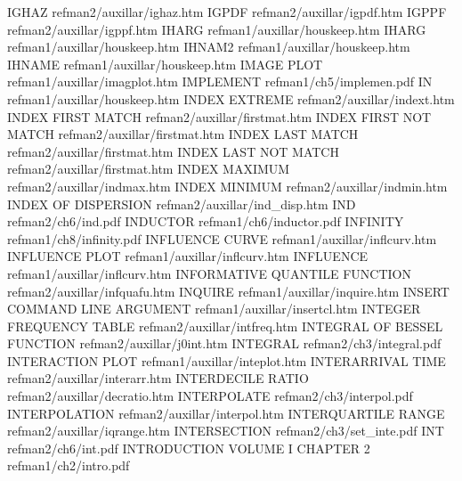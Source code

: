 IGHAZ                                   refman2/auxillar/ighaz.htm
IGPDF                                   refman2/auxillar/igpdf.htm
IGPPF                                   refman2/auxillar/igppf.htm
IHARG                                   refman1/auxillar/houskeep.htm
IHARG                                   refman1/auxillar/houskeep.htm
IHNAM2                                  refman1/auxillar/houskeep.htm
IHNAME                                  refman1/auxillar/houskeep.htm
IMAGE PLOT                              refman1/auxillar/imagplot.htm
IMPLEMENT                               refman1/ch5/implemen.pdf
IN                                      refman1/auxillar/houskeep.htm
INDEX EXTREME                           refman2/auxillar/indext.htm
INDEX FIRST MATCH                       refman2/auxillar/firstmat.htm
INDEX FIRST NOT MATCH                   refman2/auxillar/firstmat.htm
INDEX LAST MATCH                        refman2/auxillar/firstmat.htm
INDEX LAST NOT MATCH                    refman2/auxillar/firstmat.htm
INDEX MAXIMUM                           refman2/auxillar/indmax.htm
INDEX MINIMUM                           refman2/auxillar/indmin.htm
INDEX OF DISPERSION                     refman2/auxillar/ind_disp.htm
IND                                     refman2/ch6/ind.pdf
INDUCTOR                                refman1/ch6/inductor.pdf
INFINITY                                refman1/ch8/infinity.pdf
INFLUENCE CURVE                         refman1/auxillar/inflcurv.htm
INFLUENCE PLOT                          refman1/auxillar/inflcurv.htm
INFLUENCE                               refman1/auxillar/inflcurv.htm
INFORMATIVE QUANTILE FUNCTION           refman2/auxillar/infquafu.htm
INQUIRE                                 refman1/auxillar/inquire.htm
INSERT COMMAND LINE ARGUMENT            refman1/auxillar/insertcl.htm
INTEGER FREQUENCY TABLE                 refman2/auxillar/intfreq.htm
INTEGRAL OF BESSEL FUNCTION             refman2/auxillar/j0int.htm
INTEGRAL                                refman2/ch3/integral.pdf
INTERACTION PLOT                        refman1/auxillar/inteplot.htm
INTERARRIVAL TIME                       refman2/auxillar/interarr.htm
INTERDECILE RATIO                       refman2/auxillar/decratio.htm
INTERPOLATE                             refman2/ch3/interpol.pdf
INTERPOLATION                           refman2/auxillar/interpol.htm
INTERQUARTILE RANGE                     refman2/auxillar/iqrange.htm
INTERSECTION                            refman2/ch3/set_inte.pdf
INT                                     refman2/ch6/int.pdf
INTRODUCTION VOLUME I CHAPTER 2         refman1/ch2/intro.pdf

